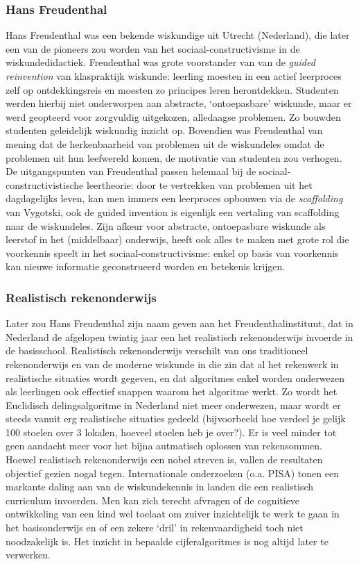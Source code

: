 \documentclass[a4paper,11pt]{article}
\begin{document}
\subsubsection{Hans Freudenthal}
Hans Freudenthal was een bekende wiskundige uit Utrecht (Nederland), die later 
een van de pioneers zou worden van het sociaal-constructivisme in de 
wiskundedidactiek. Freudenthal was grote voorstander van van de \textit{guided reinvention} 
van klaspraktijk wiskunde: leerling moesten in een actief leerproces zelf op 
ontdekkingsreis en moesten zo principes leren herontdekken. Studenten werden 
hierbij niet onderworpen aan abstracte, `ontoepasbare' wiskunde, maar er werd 
geopteerd voor zorgvuldig uitgekozen, alledaagse problemen. Zo bouwden studenten 
geleidelijk wiskundig inzicht op. Bovendien was Freudenthal van mening dat de 
herkenbaarheid van problemen uit de wiskundeles omdat de problemen uit hun leefwereld komen, de motivatie van studenten zou 
verhogen.\\

\noindent De uitgangspunten van Freudenthal passen helemaal bij de 
sociaal-constructivistische leertheorie: door te vertrekken van problemen uit 
het dagdagelijks leven, kan men immers een leerproces opbouwen via de \textit{scaffolding} 
van Vygotski, ook de guided invention is eigenlijk een vertaling van scaffolding 
naar de wiskundeles. Zijn afkeur voor abstracte, ontoepasbare wiskunde als 
leerstof in het (middelbaar) onderwijs, heeft ook alles te maken met grote rol 
die voorkennis speelt in het sociaal-constructivisme: enkel op basis van 
voorkennis kan nieuwe informatie geconstrueerd worden en betekenis krijgen.

\subsubsection{Realistisch rekenonderwijs}
Later zou Hans Freudenthal zijn naam geven aan het Freudenthalinstituut, dat in 
Nederland de afgelopen twintig jaar een het realistisch rekenonderwijs invoerde in 
de basisschool. Realistisch rekenonderwijs verschilt van ons traditioneel rekenonderwijs en van de moderne wiskunde in die zin dat al het
rekenwerk in realistische situaties wordt gegeven, en dat algoritmes enkel worden onderwezen
als leerlingen ook effectief snappen waarom het algoritme werkt. Zo wordt het Euclidisch
delingsalgoritme in Nederland niet meer onderwezen, maar wordt er steeds vanuit erg realistische
situaties gedeeld (bijvoorbeeld hoe verdeel je gelijk 100 stoelen over 3 lokalen, hoeveel
stoelen heb je over?). Er is veel minder tot geen aandacht meer voor het bijna autmatisch
oplossen van rekensommen. Hoewel realistisch rekenonderwijs een nobel streven is, vallen de resultaten objectief gezien
nogal tegen. Internationale onderzoeken (o.a. PISA) tonen een markante daling aan van
de wiskundekennis in landen die een realistisch curriculum invoerden. Men kan zich terecht
afvragen of de cognitieve ontwikkeling van een kind wel toelaat om zuiver inzichtelijk te werk
te gaan in het basisonderwijs en of een zekere ‘dril’ in rekenvaardigheid toch niet noodzakelijk
is. Het inzicht in bepaalde cijferalgoritmes is nog altijd later te verwerken.
\end{document}
